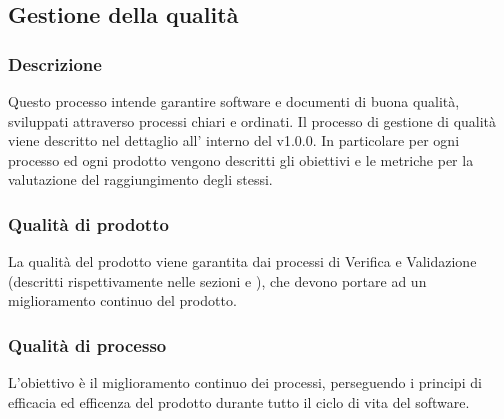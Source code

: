   \subsection{Gestione della qualità}
    \subsubsection{Descrizione}
      Questo processo intende garantire software e documenti di buona qualità, sviluppati attraverso processi chiari e ordinati. Il processo di gestione di qualità viene descritto nel dettaglio all' interno del \PdQ{} v1.0.0. In particolare per ogni processo ed ogni prodotto vengono descritti gli obiettivi e le metriche per la valutazione del raggiungimento degli stessi.

    \subsubsection*{Qualità di prodotto}
      La qualità del prodotto viene garantita dai processi di Verifica e Validazione (descritti rispettivamente nelle sezioni  e ), che devono portare ad un miglioramento continuo del prodotto.

    \subsubsection*{Qualità di processo}
      L'obiettivo è il miglioramento continuo dei processi, perseguendo i principi di efficacia ed efficenza del prodotto durante tutto il ciclo di vita del software.



